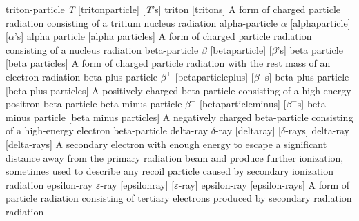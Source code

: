 \newglsXacronym%
{triton-particle}%
{{}\textsf{\textsl{T}}}%
[tritonparticle]%
[{}\textsf{\textsl{T}}'s]%
{triton}%
[tritons]%
{A form of charged particle radiation consisting of a tritium nucleus}%
{radiation}%
\newglsXacronym%
{alpha-particle}%
{{}$\alpha$}%
[alphaparticle]%
[{}$\alpha$'s]%
{alpha particle}%
[alpha particles]%
{A form of charged particle radiation consisting of a  nucleus}%
{radiation}%
\newglsXacronym%
{beta-particle}%
{{}$\beta$}%
[betaparticle]%
[{}$\beta$'s]%
{beta particle}%
[beta particles]%
{A form of charged particle radiation with the rest mass of an electron}%
{radiation}%
\newglsXacronym%
{beta-plus-particle}%
{{}$\beta^{+}$}%
[betaparticleplus]%
[{}$\beta^{+}$s]%
{beta plus particle}%
[beta plus particles]%
{A positively charged \gls{beta-particle} consisting of a high-energy positron}%
{beta-particle}%
\newglsXacronym%
{beta-minus-particle}%
{{}$\beta^{-}$}%
[betaparticleminus]%
[{}$\beta^{-}$s]%
{beta minus particle}%
[beta minus particles]%
{A negatively charged \gls{beta-particle} consisting of a high-energy electron}%
{beta-particle}%
\newglsXacronym%
{delta-ray}%
{{}$\delta${\--}ray}%
[deltaray]%
[{}$\delta${\--}rays]%
{delta{\--}ray}%
[delta{\--}rays]%
{A secondary electron with enough energy to escape a significant distance away from the primary radiation beam and produce further ionization, sometimes used to describe any recoil particle caused by secondary ionization}%
{radiation}%
\newglsXacronym%
{epsilon-ray}%
{{}$\varepsilon${\--}ray}%
[epsilonray]%
[{}$\varepsilon${\--}ray]%
{epsilon{\--}ray}%
[epsilon{\--}rays]%
{A form of particle radiation consisting of tertiary electrons produced by secondary radiation}%
{radiation}%
